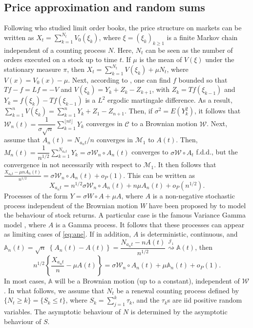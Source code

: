 \documentclass[final]{amsart}
\theoremstyle{definition}
\numberwithin{equation}{section}
\def\disp{\displaystyle}
\newcommand{\dA}{\ensuremath{\mathbb{A}}}
\newcommand{\cC}{\ensuremath{\mathcal{C}}}
\newcommand{\cJ}{\ensuremath{\mathcal{J}}}
\newcommand{\cM}{\ensuremath{\mathcal{M}}}
\newcommand{\cW}{\ensuremath{\mathcal{W}}}
\def\sn{\sqrt{n}\; }
\def\nt{{\lfloor n t \rfloor}}
\def\nt{{\lfloor n t \rfloor}}
\begin{document}
\subsection{Price approximation and random sums}\label{ssec:random_sums}

Following \cite{Chavez-Casillas/Elliott/Remillard/Swishchuk:2019,Swishchuk/Remillard/Elliott/Chavez-Casillas:2019,Guo/Remillard/Swishchuk:2020}
who studied limit order books, the price structure on markets can be written as $X_t = \sum_{k=1}^{N_t} V_0(\xi_k)$, where $\xi = (\xi_k)_{k\ge 1}$ is a finite Markov chain independent of a counting process $N$. Here, $N_t$ can be seen as the number of orders executed on a stock up to time $t$. If $\mu$ is the mean of $V(\xi)$ under the stationary measure $\pi$, then $X_t = \sum_{k=1}^{N_t} V(\xi_k)  + \mu N_t$, where $V(x) = V_0(x)-\mu$.
Next, according to \cite[Theorem 7.7.2 and Example 7.7.2]{Durrett:1996}, one can find $f$ bounded so that $ Tf-f = Lf = -V$ and $V(\xi_k) = Y_k+ Z_k-Z_{k+1}$, with $Z_k = Tf(\xi_{k-1})$ and $Y_k = f(\xi_k)-Tf(\xi_{k-1})$ is a $L^2$ ergodic martingale difference. As a result,
$\disp
\sum_{k=1}^n V(\xi_k) = \sum_{k=1}^n Y_k + Z_1-Z_{n+1}$.
Then, if $\sigma^2 = E(Y_k^2)$, it follows that   $\cW_n(t) = \dfrac{1}{\sigma \sn}\sum_{k=1}^ \nt Y_k $ converges in $\cC$ to a Brownian motion $\cW$.
Next, assume that  $A_n(t) = N_{a_nt}/n$ converges in $\cM_1$ to $A(t)$. Then,
$M_n(t) = \dfrac{1}{n^{1/2}}\sum_{k=1}^{N_{a_n t}}Y_k = \sigma \cW_{n}\circ A_n(t) $ converges to $\sigma \cW\circ A_t$ f.d.d., but the convergence in not necessarily with respect to $\cM_1$. It then follows that
$\disp
\frac{X_{a_nt}-\mu n A_n(t) }{n^{1/2}}  = \sigma \cW_{n}\circ A_n(t) +o_P(1)$.
This can be written as
\begin{equation}\label{eq:ane}
X_{a_n t} =   n^{1/2} \sigma \cW_{n}\circ A_n(t) + n \mu A_n(t) +o_P(n^{1/2}) .
\end{equation}
Processes of the form  $Y = \sigma W\circ A+ \mu A$,  where $A$ is a non-negative stochastic process independent of the Brownian motion $W$ have been proposed by \citet{Ane/Geman:2000} to model the behaviour of stock returns. A particular case is the famous Variance Gamma model \citep{Madan/Carr/Chang:1998}, where $A$ is a Gamma process. It follows that these processes can appear as limiting cases of \eqref{eq:ane}.
If in addition, $A$ is deterministic, continuous, and
$\disp  \dA_n(t) = \sn\left\{A_n(t)-A(t)\right\} = \dfrac{N_{a_n t}- n A(t)}{n^{1/2}}  \stackrel{\cJ_1}{\rightsquigarrow} \dA(t)$,
then
$$
n^{1/2}\left\{ \dfrac{ X_{a_n t} }{n}-\mu A(t)\right\}  = \sigma \cW_n\circ A_n(t)  + \mu \dA_n(t)+ o_P(1).
$$
In most cases, $\dA$ will be a Brownian motion (up to a constant), independent of $\cW$.  In what follows, we assume that $N_t$ be a renewal counting process defined by $\{N_t \ge k\} = \{S_k \le t\}$, where  $S_k = \sum_{j=1}^k \tau_k$, and the $\tau_k$s are iid positive random variables. The asymptotic behaviour of $N$ is determined by the asymptotic behaviour of $S$.
\end{document}
